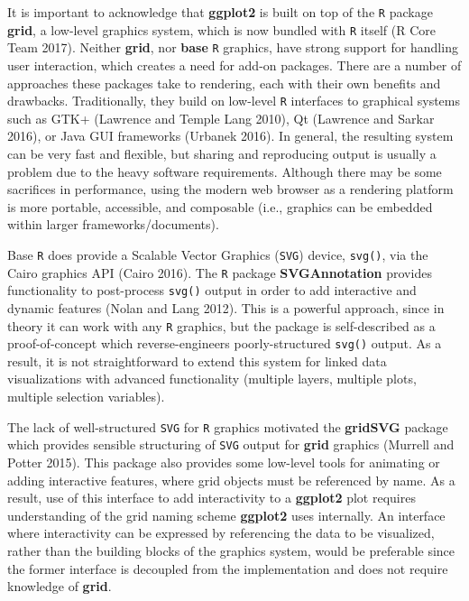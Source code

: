 \documentclass[12pt,]{article}
\theoremstyle{definition}
\theoremstyle{definition}
\theoremstyle{definition}
\theoremstyle{remark}
\begin{document}
It is important to acknowledge that \textbf{ggplot2} is built on top of
the \texttt{R} package \textbf{grid}, a low-level graphics system, which
is now bundled with \texttt{R} itself (R Core Team 2017). Neither
\textbf{grid}, nor \textbf{base} \texttt{R} graphics, have strong
support for handling user interaction, which creates a need for add-on
packages. There are a number of approaches these packages take to
rendering, each with their own benefits and drawbacks. Traditionally,
they build on low-level \texttt{R} interfaces to graphical systems such
as GTK+ (Lawrence and Temple Lang 2010), Qt (Lawrence and Sarkar 2016),
or Java GUI frameworks (Urbanek 2016). In general, the resulting system
can be very fast and flexible, but sharing and reproducing output is
usually a problem due to the heavy software requirements. Although there
may be some sacrifices in performance, using the modern web browser as a
rendering platform is more portable, accessible, and composable (i.e.,
graphics can be embedded within larger frameworks/documents).

Base \texttt{R} does provide a Scalable Vector Graphics (\texttt{SVG})
device, \texttt{svg()}, via the Cairo graphics API (Cairo 2016). The
\texttt{R} package \textbf{SVGAnnotation} provides functionality to
post-process \texttt{svg()} output in order to add interactive and
dynamic features (Nolan and Lang 2012). This is a powerful approach,
since in theory it can work with any \texttt{R} graphics, but the
package is self-described as a proof-of-concept which reverse-engineers
poorly-structured \texttt{svg()} output. As a result, it is not
straightforward to extend this system for linked data visualizations
with advanced functionality (multiple layers, multiple plots, multiple
selection variables).

The lack of well-structured \texttt{SVG} for \texttt{R} graphics
motivated the \textbf{gridSVG} package which provides sensible
structuring of \texttt{SVG} output for \textbf{grid} graphics (Murrell
and Potter 2015). This package also provides some low-level tools for
animating or adding interactive features, where grid objects must be
referenced by name. As a result, use of this interface to add
interactivity to a \textbf{ggplot2} plot requires understanding of the
grid naming scheme \textbf{ggplot2} uses internally. An interface where
interactivity can be expressed by referencing the data to be visualized,
rather than the building blocks of the graphics system, would be
preferable since the former interface is decoupled from the
implementation and does not require knowledge of \textbf{grid}.
\end{document}
